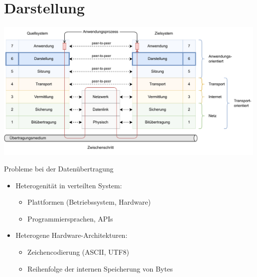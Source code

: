 \section{Darstellung}

\includegraphics[width=\textwidth]{includes/figures/defi_iso_osi_presentation.pdf}

\begin{bonus}{Probleme bei der Datenübertragung}
    \begin{itemize}
        \item Heterogenität in verteilten System:
              
              \begin{itemize}
                  \item Plattformen (Betriebssystem, Hardware)
                  \item Programmiersprachen, APIs
              \end{itemize}
        \item Heterogene Hardware-Architekturen:
              
              \begin{itemize}
                  \item Zeichencodierung (ASCII, UTF8)
                  \item Reihenfolge der internen Speicherung von Bytes
              \end{itemize}
    \end{itemize}
\end{bonus}


